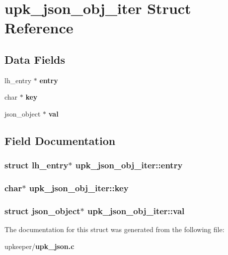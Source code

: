 \section{upk\_\-json\_\-obj\_\-iter Struct Reference}
\label{structupk__json__obj__iter}
\subsection*{Data Fields}
\begin{CompactItemize}
\item 
lh\_\-entry $\ast$ \bf{entry}
\item 
char $\ast$ \bf{key}
\item 
json\_\-object $\ast$ \bf{val}
\end{CompactItemize}


\subsection{Field Documentation}
\subsubsection{\setlength{\rightskip}{0pt plus 5cm}struct lh\_\-entry$\ast$ \bf{upk\_\-json\_\-obj\_\-iter::entry}}\label{structupk__json__obj__iter_1c3e32f6c8e4209f1ff929917bdfe45a}


\subsubsection{\setlength{\rightskip}{0pt plus 5cm}char$\ast$ \bf{upk\_\-json\_\-obj\_\-iter::key}}\label{structupk__json__obj__iter_3aaacfb4d94af503a3f625c031d09d39}


\subsubsection{\setlength{\rightskip}{0pt plus 5cm}struct json\_\-object$\ast$ \bf{upk\_\-json\_\-obj\_\-iter::val}}\label{structupk__json__obj__iter_c4a80d04d13e6472342f673579d9f6bc}




The documentation for this struct was generated from the following file:\begin{CompactItemize}
\item 
upkeeper/\bf{upk\_\-json.c}\end{CompactItemize}
